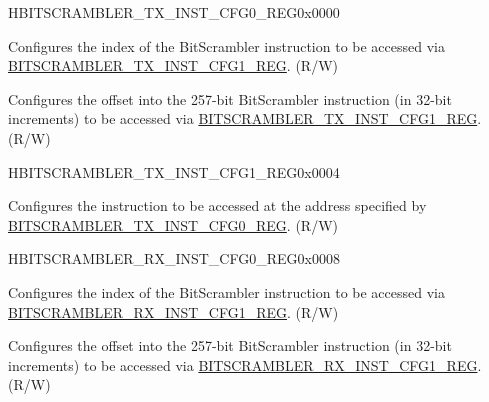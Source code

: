 \begin{register}{H}{BITSCRAMBLER\_TX\_INST\_CFG0\_REG}{0x0000}\label{regdesc:BITSCRAMBLERTXINSTCFG0REG}
%
%
%
\regnewline%
\begin{regdesc}\begin{reglist}
\label{fielddesc:BITSCRAMBLERTXINSTIDX}\item [BITSCRAMBLER\_TX\_INST\_IDX] Configures the index of the BitScrambler instruction to be accessed via \hyperref[regdesc:BITSCRAMBLERTXINSTCFG1REG]{BITSCRAMBLER\_TX\_INST\_CFG1\_REG}. (R/W)
\label{fielddesc:BITSCRAMBLERTXINSTPOS}\item [BITSCRAMBLER\_TX\_INST\_POS] Configures the offset into the 257-bit BitScrambler instruction (in 32-bit increments) to be accessed via \hyperref[regdesc:BITSCRAMBLERTXINSTCFG1REG]{BITSCRAMBLER\_TX\_INST\_CFG1\_REG}. (R/W)
\end{reglist}\end{regdesc}
\end{register}


\begin{register}{H}{BITSCRAMBLER\_TX\_INST\_CFG1\_REG}{0x0004}\label{regdesc:BITSCRAMBLERTXINSTCFG1REG}
%
\regnewline%
\begin{regdesc}\begin{reglist}
\label{fielddesc:BITSCRAMBLERTXINST}\item [BITSCRAMBLER\_TX\_INST] Configures the instruction to be accessed at the address specified by \hyperref[regdesc:BITSCRAMBLERTXINSTCFG0REG]{BITSCRAMBLER\_TX\_INST\_CFG0\_REG}. (R/W)
\end{reglist}\end{regdesc}
\end{register}


\begin{register}{H}{BITSCRAMBLER\_RX\_INST\_CFG0\_REG}{0x0008}\label{regdesc:BITSCRAMBLERRXINSTCFG0REG}
%
%
%
\regnewline%
\begin{regdesc}\begin{reglist}
\label{fielddesc:BITSCRAMBLERRXINSTIDX}\item [BITSCRAMBLER\_RX\_INST\_IDX] Configures the index of the BitScrambler instruction to be accessed via \hyperref[regdesc:BITSCRAMBLERRXINSTCFG1REG]{BITSCRAMBLER\_RX\_INST\_CFG1\_REG}. (R/W)
\label{fielddesc:BITSCRAMBLERRXINSTPOS}\item [BITSCRAMBLER\_RX\_INST\_POS] Configures the offset into the 257-bit BitScrambler instruction (in 32-bit increments) to be accessed via \hyperref[regdesc:BITSCRAMBLERTXINSTCFG1REG]{BITSCRAMBLER\_RX\_INST\_CFG1\_REG}. (R/W)
\end{reglist}\end{regdesc}
\end{register}


